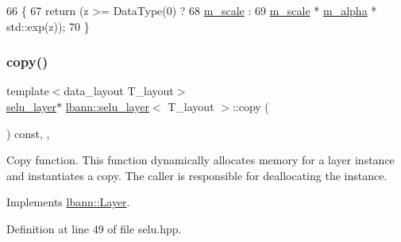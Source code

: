 \begin{DoxyCode}
66                                                             \{
67     \textcolor{keywordflow}{return} (z >= DataType(0) ?
68             \hyperlink{classlbann_1_1selu__layer_a9575be8104b1b24232a2d167405e693a}{m\_scale} :
69             \hyperlink{classlbann_1_1selu__layer_a9575be8104b1b24232a2d167405e693a}{m\_scale} * \hyperlink{classlbann_1_1selu__layer_a72b22e92f3e70f6b996329e5b170554e}{m\_alpha} * std::exp(z));
70   \}
\end{DoxyCode}
\mbox{\label{classlbann_1_1selu__layer_a93b696880571fad03f9aa142153117fa}} 
\subsubsection{\texorpdfstring{copy()}{copy()}}
{\footnotesize\ttfamily template$<$data\+\_\+layout T\+\_\+layout$>$ \\
\hyperlink{classlbann_1_1selu__layer}{selu\+\_\+layer}$\ast$ \hyperlink{classlbann_1_1selu__layer}{lbann\+::selu\+\_\+layer}$<$ T\+\_\+layout $>$\+::copy (\begin{DoxyParamCaption}{ }\end{DoxyParamCaption}) const\hspace{0.3cm}{\ttfamily [inline]}, {\ttfamily [override]}, {\ttfamily [virtual]}}

Copy function. This function dynamically allocates memory for a layer instance and instantiates a copy. The caller is responsible for deallocating the instance. 

Implements \hyperlink{classlbann_1_1Layer_af420f22bbac801c85483ade84588a23f}{lbann\+::\+Layer}.



Definition at line 49 of file selu.\+hpp.


